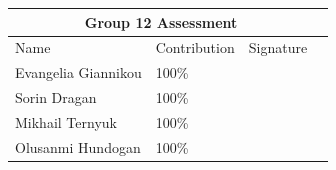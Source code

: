 \documentclass[11pt,a4paper,oneside]{article}
\begin{document}
\clearpage 
\printbibliography

\clearpage
\Large
\begin{tabularx}{\textwidth}{|X|X|X|X|}
\hline
\multicolumn{3}{|c|}{Group 12 Assessment}    \\ \hline
Name                & Contribution & Signature \\ \hline
\hline
Evangelia Giannikou & 100\%        &           \\ \hline
Sorin Dragan        & 100\%        &           \\ \hline
Mikhail Ternyuk     & 100\%        &           \\ \hline
Olusanmi Hundogan   & 100\%        &           \\ \hline
\end{tabularx}
\end{document}
